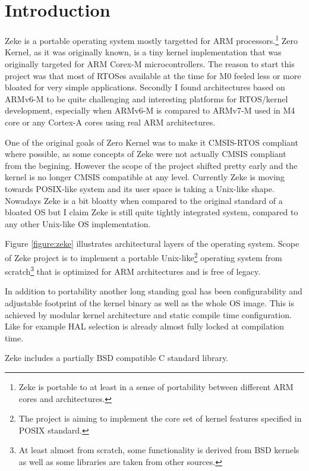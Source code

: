 \chapter*{Introduction}

Zeke is a portable operating system mostly targetted for ARM
processors.\footnote{Zeke is portable to at least in a sense of portability
    between different ARM cores and architectures.}
Zero Kernel, as it was originally known, is a tiny kernel implementation that
was originally targeted for ARM Corex-M microcontrollers. The reason to start
this project was that most of RTOSes available at the time for M0 feeled less
or more bloated for very simple applications. Secondly I found architectures
based on ARMv6-M to be quite challenging and interesting platforms for
RTOS/kernel development, especially when ARMv6-M is compared to ARMv7-M used
in M4 core or any Cortex-A cores using real ARM architectures.

One of the original goals of Zero Kernel was to make it CMSIS-RTOS compliant
where possible, as some concepts of Zeke were not actually CMSIS compliant
from the begining. However the scope of the project shifted pretty early and
the kernel is no longer CMSIS compatible at any level. Currently Zeke is
moving towards POSIX-like system and its user space is taking a Unix-like
shape. Nowadays Zeke is a bit bloatty when compared to the original standard
of a bloated OS but I claim Zeke is still quite tightly integrated system,
compared to any other Unix-like OS implementation.

Figure \ref{figure:zeke} illustrates architectural layers of the operating
system. Scope of Zeke project is to implement a portable
Unix-like\footnote{The project is aiming to implement the core set of kernel
    features specified in \ac{POSIX} standard.} operating system from
scratch\footnote{At least almost from scratch, some functionality is derived
from BSD kernels as well as some libraries are taken from other sources.} that
is optimized for ARM architectures and is free of legacy.

In addition to portability another long standing goal has been configurability
and adjustable footprint of the kernel binary as well as the whole OS image.
This is achieved by modular kernel architecture and static compile time
configuration. Like for example \ac{HAL} selection is already almost fully
locked at compilation time.

Zeke includes a partially BSD compatible C standard library.

